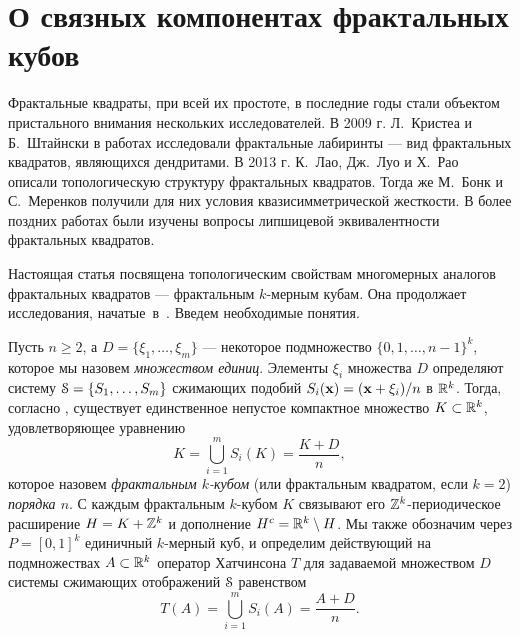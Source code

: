 \chapter{О связных компонентах фрактальных кубов}


Фрактальные квадраты, при всей их простоте, в последние годы стали объектом пристального внимания нескольких исследователей. В 2009 г. Л.~Кристеа и Б.~Штайнски в работах \cite{CS1,CS2} исследовали фрактальные лабиринты  --- вид фрактальных квадратов, являющихся дендритами. В 2013 г. К.~Лао, Дж.~Луо и Х.~Рао \cite{LLR2013} описали топологическую структуру фрактальных квадратов. Тогда же М.~Бонк и С.~Меренков \cite{BM} получили для них условия квазисимметрической жесткости. В более поздних работах \cite{LL,RW} были изучены вопросы липшицевой эквивалентности фрактальных квадратов.

Настоящая статья посвящена топологическим свойствам многомерных аналогов фрактальных квадратов --- фрактальным $k$-мерным кубам.
Она продолжает исследования, начатые~в~\cite{frcube}.
Введем необходимые понятия.



Пусть $n\geq 2$, а  $ D=\{\xi_1,\ldots,\xi_m\}$ ---  некоторое подмножество  $ \{0,1, \ldots , n-1\}^k$,  которое  мы назовем {\em множеством единиц}. Элементы $\xi_i$ множества $ D$ определяют систему ${\EuScript S}=\{S_1,\ldots,S_m\}$ сжимающих подобий $S_i({\bf{x}})=({\bf{x}}+\xi_i)/n$ в $\mathbb{R}^k$. 
Тогда, согласно  \cite[Theorem(3), p.10]{Hut1981}, существует единственное непустое компактное множество $K\subset \mathbb{R}^k$, удовлетворяющее уравнению 
\begin{equation}\label{Feq} 
K=\bigcup\limits_{i=1}^m S_i(K)=\frac{K+ D}{n},
\end{equation}
которое назовем {\em фрактальным $k$-кубом} (или фрактальным квадратом, если $k=2$) {\em порядка $n$}.
С каждым фрактальным $k$-кубом $K$ связывают его $\mathbb{Z}^k$-периодическое расширение $H=K+\mathbb{Z}^k$  и   дополнение $H^c=\mathbb{R}^k\setminus H$. 
Мы также обозначим через $P=[0,1]^k$ единичный $k$-мерный куб, и  определим действующий на  подмножествах  $A\subset \mathbb{R}^k$  оператор Хатчинсона $T$ для задаваемой множеством $ D$ системы сжимающих отображений ${\EuScript S}$  равенством  
\begin{equation}
T(A)=\bigcup\limits_{i=1}^m S_i(A)=\dfrac{A+ D}{n}.
\end{equation}

